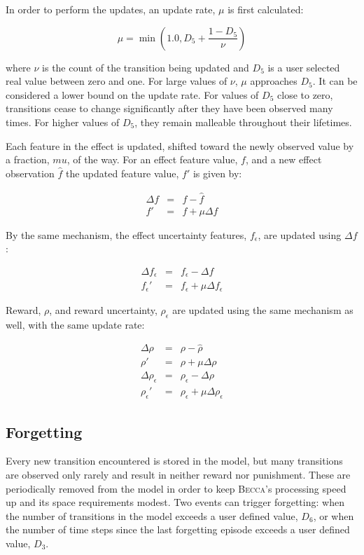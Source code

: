 In order to perform the updates, an update rate, $\mu$ is first calculated:

\begin{equation}
\mu = \min(1.0, D_5+ \frac{1 - D_5}{\nu})
\end{equation}

where $\nu$ is the count of the transition being updated and $D_5$ is a user selected real value between zero and one. For large values of $\nu$, $\mu$ approaches $D_5$. It can be considered a lower bound on the update rate. For values of $D_5$ close to zero, transitions cease to change significantly after they have been observed many times. For higher values of $D_5$, they remain malleable throughout their lifetimes.

Each feature in the effect is updated, shifted toward the newly observed value by a fraction, $mu$, of the way. For an effect feature value, $f$, and a new effect observation $\hat{f}$ the updated feature value, $f'$ is given by:

\begin{eqnarray}
\Delta f &= &f - \hat{f} \\
f' &=& f + \mu \Delta f
\end{eqnarray}

By the same mechanism, the effect uncertainty features, $f_\epsilon$, are updated using $\Delta f$:

\begin{eqnarray}
\Delta f_\epsilon &=& f_\epsilon  - \Delta f \\
f_\epsilon' &=& f_\epsilon + \mu \Delta f_\epsilon
\end{eqnarray}

Reward, $\rho$, and reward uncertainty, $\rho_\epsilon$ are updated using the same mechanism as well, with the same update rate:

\begin{eqnarray}
\Delta \rho &= &\rho - \hat{\rho} \\
\rho' &=& \rho + \mu \Delta \rho \\
\Delta \rho_\epsilon &=& \rho_\epsilon  - \Delta \rho \\
\rho_\epsilon' &=& \rho_\epsilon + \mu \Delta \rho_\epsilon
\end{eqnarray}

\subsection{Forgetting}
Every new transition encountered is stored in the model, but many transitions are observed only rarely and result in neither reward nor punishment. These are periodically removed from the model in order to keep \textsc{Becca}'s processing speed up and its space requirements modest. Two events can trigger forgetting: when the number of transitions in the model exceeds a user defined value, $D_6$, or when the number of time steps since the last forgetting episode exceeds a user defined value, $D_3$.

